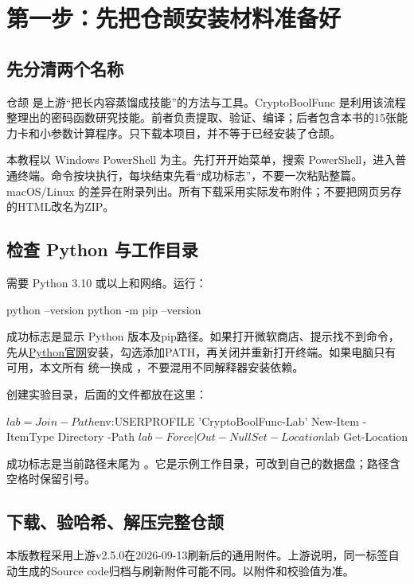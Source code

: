 \section{第一步：先把仓颉安装材料准备好}
\subsection{先分清两个名称}
仓颉  是上游“把长内容蒸馏成技能”的方法与工具。CryptoBoolFunc 是利用该流程整理出的密码函数研究技能。前者负责提取、验证、编译；后者包含本书的15张能力卡和小参数计算程序。只下载本项目，并不等于已经安装了仓颉。

本教程以 Windows PowerShell 为主。先打开开始菜单，搜索 PowerShell，进入普通终端。命令按块执行，每块结束先看“成功标志”，不要一次粘贴整篇。macOS/Linux 的差异在附录列出。所有下载采用实际发布附件；不要把网页另存的HTML改名为ZIP。

\subsection{检查 Python 与工作目录}
需要 Python 3.10 或以上和网络。运行：
\begin{code}
python --version
python -m pip --version
\end{code}
成功标志是显示 Python 版本及pip路径。如果打开微软商店、提示找不到命令，先从\href{https://www.python.org/downloads/}{Python官网}安装，勾选添加PATH，再关闭并重新打开终端。如果电脑只有  可用，本文所有  统一换成 ，不要混用不同解释器安装依赖。

创建实验目录，后面的文件都放在这里：
\begin{code}
$lab = Join-Path $env:USERPROFILE 'CryptoBoolFunc-Lab'
New-Item -ItemType Directory -Path $lab -Force | Out-Null
Set-Location $lab
Get-Location
\end{code}
成功标志是当前路径末尾为 。它是示例工作目录，可改到自己的数据盘；路径含空格时保留引号。

\subsection{下载、验哈希、解压完整仓颉}
本版教程采用上游v2.5.0在2026-09-13刷新后的通用附件。上游说明，同一标签自动生成的Source code归档与刷新附件可能不同。以附件和校验值为准\cite{cangjie}。


